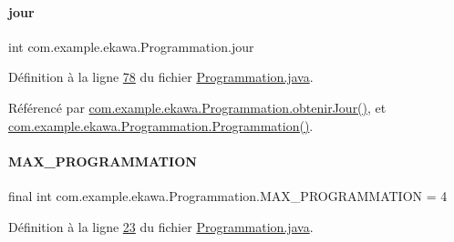 \mbox{\label{classcom_1_1example_1_1ekawa_1_1_programmation_a96605063cb4177fa382b1ce2388f544f}} 
\paragraph{\texorpdfstring{jour}{jour}}
{\footnotesize\ttfamily int com.\+example.\+ekawa.\+Programmation.\+jour\hspace{0.3cm}{\ttfamily [private]}}



Définition à la ligne \hyperlink{_programmation_8java_source_l00078}{78} du fichier \hyperlink{_programmation_8java_source}{Programmation.\+java}.



Référencé par \hyperlink{_programmation_8java_source_l00142}{com.\+example.\+ekawa.\+Programmation.\+obtenir\+Jour()}, et \hyperlink{_programmation_8java_source_l00091}{com.\+example.\+ekawa.\+Programmation.\+Programmation()}.

\mbox{\label{classcom_1_1example_1_1ekawa_1_1_programmation_a056f8e2549c22393882b7306223a64c2}} 
\paragraph{\texorpdfstring{M\+A\+X\+\_\+\+P\+R\+O\+G\+R\+A\+M\+M\+A\+T\+I\+ON}{MAX\_PROGRAMMATION}}
{\footnotesize\ttfamily final int com.\+example.\+ekawa.\+Programmation.\+M\+A\+X\+\_\+\+P\+R\+O\+G\+R\+A\+M\+M\+A\+T\+I\+ON = 4\hspace{0.3cm}{\ttfamily [static]}}



Définition à la ligne \hyperlink{_programmation_8java_source_l00023}{23} du fichier \hyperlink{_programmation_8java_source}{Programmation.\+java}.



